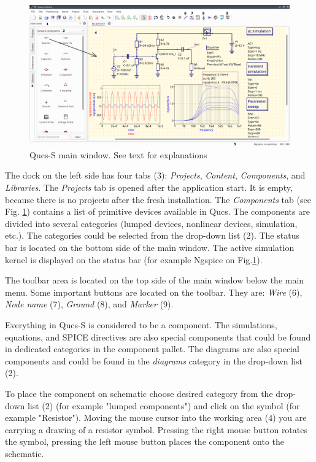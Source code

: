 \documentclass[a4paper,12pt]{article}
\begin{document}
\begin{figure}[!ht]
  \begin{center}
    \includegraphics[width=\textwidth]{img/mainwin.png}
  \end{center}
  \caption{Qucs-S main window. See text for explanations} \label{fig:mainwin}
\end{figure}

The dock on the left side has four tabs (3): \emph{Projects}, \emph{Content}, \emph{Components}, and \emph{Libraries}. The \emph{Projects} tab is opened after the application start. It is empty, because there is no projects after the fresh installation. The \emph{Components} tab (see Fig. \ref{fig:mainwin}) contains a list of primitive devices available in Qucs. The components are divided into several categories (lumped devices, nonlinear devices, simulation, etc.). The categories could be selected from the drop-down list (2). The status bar is located on the bottom side of the main window. The active simulation kernel is displayed on the status bar (for example Ngspice on Fig.\ref{fig:mainwin}). 

The toolbar area is located on the top side of the main window below the main menu. Some important buttons are located on the toolbar. They are: \emph{Wire} (6), \emph{Node name} (7), \emph{Ground} (8), and \emph{Marker} (9).

Everything in Qucs-S is considered to be a component. The simulations, equations, and SPICE directives are also special components that could be found in dedicated categories in the component pallet. The diagrams are also special components and could be found in the \emph{diagrams} category in the drop-down list (2).

To place the component on schematic choose desired category from the drop-down list (2) (for example "lumped components") and click on the symbol (for example "Resistor"). Moving the mouse cursor into the working area (4) you are carrying a drawing of a resistor symbol. Pressing the right mouse button rotates the symbol, pressing the left mouse button places the component onto the schematic. 
\end{document}
